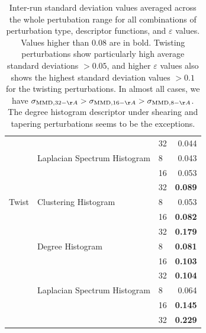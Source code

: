 \begin{table}
{\begin{tabular}{lllr}
    &                              & 32 &           0.044 \\
    & Laplacian Spectrum Histogram & 8  &           0.043 \\
    &                              & 16 &           0.053 \\
    &                              & 32 &           \textbf{0.089} \\
    Twist & Clustering Histogram & 8  &           0.053 \\
    &                              & 16 &           \textbf{0.082} \\
    &                              & 32 &           \textbf{0.179} \\
    & Degree Histogram & 8  &           \textbf{0.081} \\
    &                              & 16 &           \textbf{0.103} \\
    &                              & 32 &           \textbf{0.104} \\
    & Laplacian Spectrum Histogram & 8  &           0.064 \\
    &                              & 16 &           \textbf{0.145} \\
    &                              & 32 &           \textbf{0.229} \\
    \bottomrule
  \end{tabular}
}
\caption[Inter-run standard deviation values averaged across the whole
pertubation range for all combinations of perturbation type, descriptor
functions, and $\varepsilon$ values.]{Inter-run standard deviation values
averaged across the whole pertubation range for all combinations of perturbation
type, descriptor functions, and $\varepsilon$ values. Values higher than $0.08$
are in bold. Twisting perturbations show particularly high average standard
deviations $>0.05$, and higher $\varepsilon$ values also shows the highest
standard deviation values $>0.1$ for the twisting perturbations. In almost all
cases, we have $\sigma_{\MMD, 32-\AA}>\sigma_{\MMD, 16-\AA}>\sigma_{\MMD,
8-\AA}$. The degree histogram descriptor under shearing and tapering
perturbations seems to be the exceptions.}
  \label{tab:std_dev_epsilon_influence}
\end{table}


